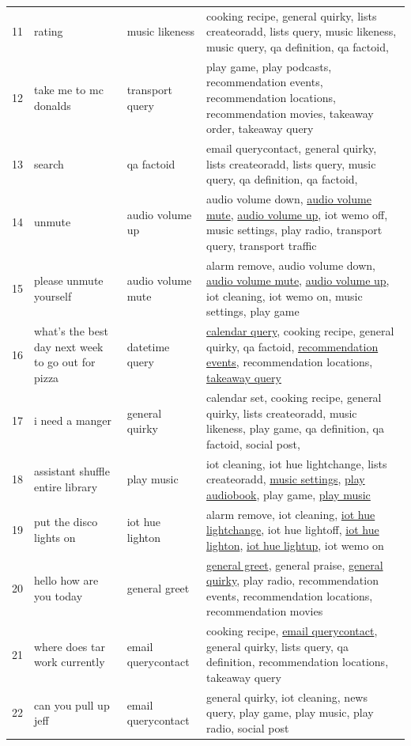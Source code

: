 \documentclass[11pt]{article}
\begin{document}
\begin{table}[h!]
\begin{tabular}{l p{} p{} p{}}
11 & rating & music likeness & cooking recipe, general quirky, lists createoradd, lists query, music likeness, music query, qa definition, qa factoid,  \\
12 & take me to mc donalds & transport query & play game, play podcasts, recommendation events, recommendation locations, recommendation movies, takeaway order, takeaway query \\
13 & search & qa factoid & email querycontact, general quirky, lists createoradd, lists query, music query, qa definition, qa factoid,  \\
14 & unmute & audio volume up & audio volume down, \underline{audio volume mute}, \underline{audio volume up}, iot wemo off, music settings, play radio, transport query, transport traffic \\
15 & please unmute yourself & audio volume mute & alarm remove, audio volume down, \underline{audio volume mute}, \underline{audio volume up}, iot cleaning, iot wemo on, music settings, play game \\
16 & what's the best day next week to go out for pizza & datetime query & \underline{calendar query}, cooking recipe, general quirky, qa factoid, \underline{recommendation events}, recommendation locations, \underline{takeaway query} \\
17 & i need a manger & general quirky & calendar set, cooking recipe, general quirky, lists createoradd, music likeness, play game, qa definition, qa factoid, social post,  \\
18 & assistant shuffle entire library & play music & iot cleaning, iot hue lightchange, lists createoradd, \underline{music settings}, \underline{play audiobook}, play game, \underline{play music} \\
19 & put the disco lights on & iot hue lighton & alarm remove, iot cleaning, \underline{iot hue lightchange}, iot hue lightoff, \underline{iot hue lighton}, \underline{iot hue lightup}, iot wemo on \\
20 & hello how are you today & general greet & \underline{general greet}, general praise, \underline{general quirky}, play radio, recommendation events, recommendation locations, recommendation movies \\
21 & where does tar work currently & email querycontact & cooking recipe, \underline{email querycontact}, general quirky, lists query, qa definition, recommendation locations, takeaway query \\
22 & can you pull up jeff & email querycontact & general quirky, iot cleaning, news query, play game, play music, play radio, social post \\

\end{tabular}
\end{table}
\end{document}
